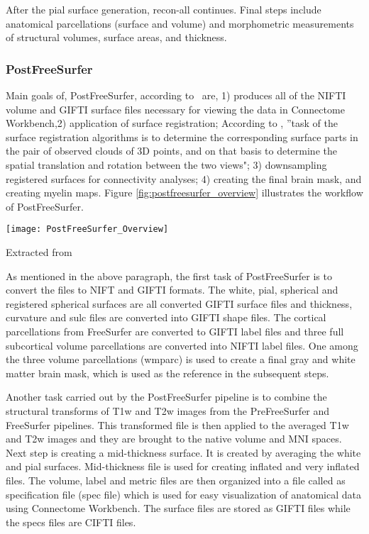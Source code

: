 After the pial surface generation, recon-all continues. Final steps include anatomical parcellations (surface and volume) and morphometric measurements of structural volumes, surface areas, and thickness.

\subsubsection{PostFreeSurfer}
Main goals of, PostFreeSurfer, according to~\cite{Gla13} are, 1) produces all of the NIFTI volume and GIFTI surface files necessary for viewing the data in Connectome Workbench,2) application of surface registration; According to \cite{DBLP:journals/corr/HrgeticP13}, ''task of the surface registration algorithms is to determine the corresponding surface parts in the pair of observed clouds of 3D points, and on that basis to determine the spatial translation and rotation between the two views"; 3) downsampling registered surfaces for connectivity analyses; 4) creating the final brain mask, and creating myelin maps. Figure \ref{fig:postfreesurfer_overview} illustrates the workflow of PostFreeSurfer.\\

\begin{center}
  \texttt{[image: PostFreeSurfer\_Overview]}
  \label{fig:postfreesurfer_overview}
  \caption*{Extracted from \cite{Gla13}}
\end{center}

As mentioned in the above paragraph, the first task of PostFreeSurfer is to convert the files to NIFT and GIFTI formats. The white, pial, spherical and registered spherical surfaces are all converted GIFTI surface files and thickness, curvature and sulc files are converted into GIFTI shape files. The cortical parcellations from FreeSurfer are converted to GIFTI label files and three full subcortical volume parcellations are converted into NIFTI label files. One among the three volume parcellations (wmparc) is used to create a final gray and white matter brain mask, which is used as the reference in the subsequent steps.

Another task carried out by the PostFreeSurfer pipeline is to combine the structural transforms of T1w and T2w images from the PreFreeSurfer and FreeSurfer pipelines. This transformed file is then applied to the averaged T1w and T2w images and they are brought to the native volume and MNI spaces. Next step is creating a mid-thickness surface. It is created by averaging the white and pial surfaces. Mid-thickness file is used for creating inflated and very inflated files. The volume, label and metric files are then organized into a file called as specification file (spec file) which is used for easy visualization of anatomical data using Connectome Workbench. The surface files are stored as GIFTI files while the specs files are CIFTI files.

